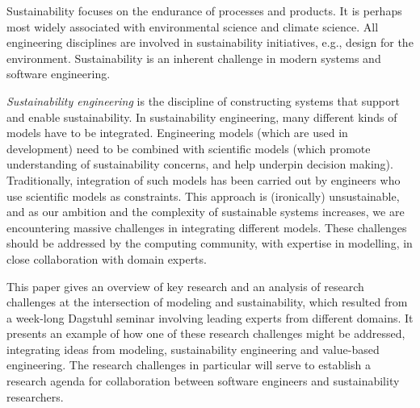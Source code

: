 Sustainability focuses on the endurance of processes and products.  It is perhaps most widely associated with environmental science and climate science. All engineering disciplines are involved in sustainability initiatives, e.g., design for the environment. Sustainability is an inherent challenge in modern systems and software engineering. 

\textit{Sustainability engineering} is the discipline of constructing systems that support and enable sustainability. In sustainability engineering, many different kinds of models have to be integrated. Engineering models (which are used in development) need to be combined with scientific models (which  promote understanding of sustainability concerns, and help underpin decision making). Traditionally, integration of such models has been carried out by engineers who use scientific models as constraints.  This approach is (ironically) unsustainable, and as our ambition and the complexity of sustainable systems increases, we are encountering massive challenges in integrating different models. These challenges should be addressed by the computing community, with expertise in modelling, in close collaboration with domain experts.

This paper gives an overview of key research and an analysis of research challenges at the intersection of modeling and sustainability, which resulted from a week-long Dagstuhl seminar involving leading experts from different domains. It presents an example of how one of these research challenges might be addressed, integrating ideas from modeling, sustainability engineering and value-based engineering. The research challenges in particular will serve to establish a research agenda for collaboration between software engineers and sustainability researchers.
